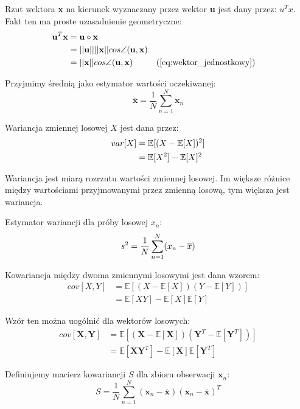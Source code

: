 \documentclass[oneside, eng]{mgr}
\newcommand{\bb}{\textbf}
\begin{document}
Rzut wektora \bb{x} na kierunek wyznaczany przez wektor \bb{u} jest dany przez: $u^{T}x$. Fakt ten ma proste uzasadnienie geometryczne:
\begin{align*}	
	\bb{u}^{T} \bb{x} &= \bb{u} \circ \bb{x} \\
		   & = ||\bb{u}|| ||\bb{x}|| cos \angle (\bb{u}, \bb{x}) \index{1} \\
		   &= ||\bb{x}|| cos \angle (\bb{u}, \bb{x}) \index{1} && \text{(\ref{eq:wektor_jednostkowy})}
\end{align*}

Przyjmimy średnią jako estymator wartości oczekiwanej:
\begin{equation}	\overline{\bb{x}} = \frac{1}{N} \sum_{n=1}^{N} \bb{x}_n \end{equation}

Wariancja zmiennej losowej $X$ jest dana przez:
\begin{align*}	\notag
	var[X]  &= \mathbb{E}[(X - \mathbb{E}[X])^2] \\
			&= \mathbb{E}[X^2] - \mathbb{E}[X]^2
\end{align*}

Wariancja jest miarą rozrzutu wartości zmiennej losowej. Im większe różnice między wartościami przyjmowanymi przez zmienną losową, tym większa jest wariancja.

Estymator wariancji dla próby losowej $x_n$:
\begin{equation}	\notag
	s^2 = \frac{1}{N} \sum_{n=1}^{N}(x_n - \overline{x})
\end{equation}

Kowariancja między dwoma zmiennymi losowymi jest dana wzorem:
\begin{align}	
	cov[X,Y] &= \mathbb{E}[(X - \mathbb{E}[X])(Y - \mathbb{E}[Y])]  \label{eq:cov} \\ 
			 &= \mathbb{E}[XY] - \mathbb{E}[X]\mathbb{E}[Y] \nonumber
\end{align}

Wzór ten można uogólnić dla wektorów losowych:
\begin{align*}
	cov[\textbf{X}, \bb{Y}] &= \mathbb{E}[(\bb{X} - \mathbb{E}[\bb{X}])(\bb{Y}^T - \mathbb{E}[\bb{Y}^T])] \\
							&= \mathbb{E}[\bb{X}\bb{Y}^T] - \mathbb{E}[\bb{X}]\mathbb{E}[\bb{Y}^T]
\end{align*}

Definiujemy macierz kowariancji $S$ dla zbioru obserwacji $\bb{x}_n$:
\begin{equation}
	S = \frac{1}{N} \sum_{n=1}^{N} (\bb{x}_n - \overline{\bb{x}})(\bb{x}_n - \overline{\bb{x}})^T
\end{equation}
\end{document}

